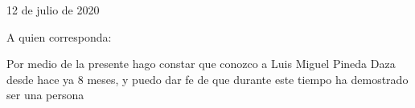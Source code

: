 \documentclass[10pt]{article}
\begin{document}
 12 de julio de 2020

\begin{huge}
	A quien corresponda: 
\end{huge}

Por medio de la presente hago constar que conozco a Luis Miguel Pineda Daza desde hace ya 8 meses, y puedo dar fe de que durante este tiempo ha demostrado ser una persona 
\end{document}
